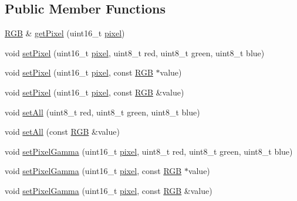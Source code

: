 \subsection*{Public Member Functions}
\begin{DoxyCompactItemize}
\item 
\hyperlink{classflame_1_1_r_g_b}{R\-G\-B} \& \hyperlink{classflame_1_1_r_g_b_l_e_d_strip_a7b7987933b485e220491af1b66ab8ffd}{get\-Pixel} (uint16\-\_\-t \hyperlink{_display___monochrome___buffered_8h_a9d20fe94f93b6c220969bb9050dfe1dc}{pixel})
\item 
void \hyperlink{classflame_1_1_r_g_b_l_e_d_strip_aa53864c1db3a7c08d62d63bb195c4648}{set\-Pixel} (uint16\-\_\-t \hyperlink{_display___monochrome___buffered_8h_a9d20fe94f93b6c220969bb9050dfe1dc}{pixel}, uint8\-\_\-t red, uint8\-\_\-t green, uint8\-\_\-t blue)
\item 
void \hyperlink{classflame_1_1_r_g_b_l_e_d_strip_a722fba92d83dc1fd229d173135af7aa5}{set\-Pixel} (uint16\-\_\-t \hyperlink{_display___monochrome___buffered_8h_a9d20fe94f93b6c220969bb9050dfe1dc}{pixel}, const \hyperlink{classflame_1_1_r_g_b}{R\-G\-B} $\ast$value)
\item 
void \hyperlink{classflame_1_1_r_g_b_l_e_d_strip_a0882eeb49919e625d72679629bef259a}{set\-Pixel} (uint16\-\_\-t \hyperlink{_display___monochrome___buffered_8h_a9d20fe94f93b6c220969bb9050dfe1dc}{pixel}, const \hyperlink{classflame_1_1_r_g_b}{R\-G\-B} \&value)
\item 
void \hyperlink{classflame_1_1_r_g_b_l_e_d_strip_a4fc640b5667900a23ad401376da13e75}{set\-All} (uint8\-\_\-t red, uint8\-\_\-t green, uint8\-\_\-t blue)
\item 
void \hyperlink{classflame_1_1_r_g_b_l_e_d_strip_a0ad74b5f468d1bbaccbfda17603c647f}{set\-All} (const \hyperlink{classflame_1_1_r_g_b}{R\-G\-B} \&value)
\item 
void \hyperlink{classflame_1_1_r_g_b_l_e_d_strip_a387145e47219c89040107028d491e95f}{set\-Pixel\-Gamma} (uint16\-\_\-t \hyperlink{_display___monochrome___buffered_8h_a9d20fe94f93b6c220969bb9050dfe1dc}{pixel}, uint8\-\_\-t red, uint8\-\_\-t green, uint8\-\_\-t blue)
\item 
void \hyperlink{classflame_1_1_r_g_b_l_e_d_strip_aca3a00b9a788b568f6b6e48ae4cb5181}{set\-Pixel\-Gamma} (uint16\-\_\-t \hyperlink{_display___monochrome___buffered_8h_a9d20fe94f93b6c220969bb9050dfe1dc}{pixel}, const \hyperlink{classflame_1_1_r_g_b}{R\-G\-B} $\ast$value)
\item 
void \hyperlink{classflame_1_1_r_g_b_l_e_d_strip_a8fbe9d1fad0f90e97c866c6681c48131}{set\-Pixel\-Gamma} (uint16\-\_\-t \hyperlink{_display___monochrome___buffered_8h_a9d20fe94f93b6c220969bb9050dfe1dc}{pixel}, const \hyperlink{classflame_1_1_r_g_b}{R\-G\-B} \&value)

\end{DoxyCompactItemize}
